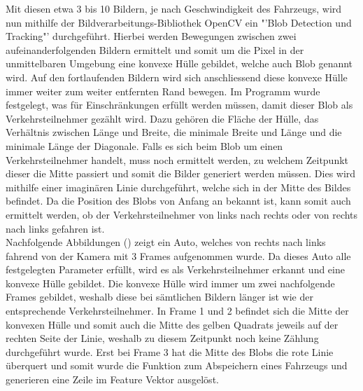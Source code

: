 Mit diesen etwa 3 bis 10 Bildern, je nach Geschwindigkeit des Fahrzeugs, wird nun mithilfe der Bildverarbeitungs-Bibliothek OpenCV ein "'Blob Detection und Tracking"' durchgeführt. Hierbei werden Bewegungen zwischen zwei aufeinanderfolgenden Bildern ermittelt und somit um die Pixel in der unmittelbaren Umgebung eine konvexe Hülle gebildet, welche auch Blob genannt wird. Auf den fortlaufenden Bildern wird sich anschliessend diese konvexe Hülle immer weiter zum weiter entfernten Rand bewegen. Im Programm wurde festgelegt, was für Einschränkungen erfüllt werden müssen, damit dieser Blob als Verkehrsteilnehmer gezählt wird. Dazu gehören die Fläche der Hülle, das Verhältnis zwischen Länge und Breite, die minimale Breite und Länge und die minimale Länge der Diagonale. Falls es sich beim Blob um einen Verkehrsteilnehmer handelt, muss noch ermittelt werden, zu welchem Zeitpunkt dieser die Mitte passiert und somit die Bilder generiert werden müssen. Dies wird mithilfe einer imaginären Linie durchgeführt, welche sich in der Mitte des Bildes befindet. Da die Position des Blobs von Anfang an bekannt ist, kann somit auch ermittelt werden, ob der Verkehrsteilnehmer von links nach rechts oder von rechts nach links gefahren ist.\\
Nachfolgende Abbildungen () zeigt ein Auto, welches von rechts nach links fahrend von der Kamera mit 3 Frames aufgenommen wurde. Da dieses Auto alle festgelegten Parameter erfüllt, wird es als Verkehrsteilnehmer erkannt und eine konvexe Hülle gebildet. Die konvexe Hülle wird immer um zwei nachfolgende Frames gebildet, weshalb diese bei sämtlichen Bildern länger ist wie der entsprechende Verkehrsteilnehmer. In Frame 1 und 2 befindet sich die Mitte der konvexen Hülle und somit auch die Mitte des gelben Quadrats jeweils auf der rechten Seite der Linie, weshalb zu diesem Zeitpunkt noch keine Zählung durchgeführt wurde. Erst bei Frame 3 hat die Mitte des Blobs die rote Linie überquert und somit wurde die Funktion zum Abspeichern eines Fahrzeugs und generieren eine Zeile im Feature Vektor ausgelöst.

